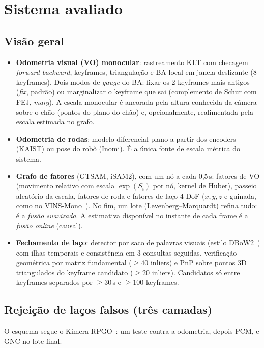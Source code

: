 \documentclass[11pt,a4paper]{article}
\begin{document}
\section{Sistema avaliado}
\label{sec:sistema}

\subsection{Visão geral}
\begin{itemize}
  \item \textbf{Odometria visual (VO) monocular}: rastreamento KLT com checagem \emph{forward-backward}, keyframes,
        triangulação e BA local em janela deslizante (8 keyframes). Dois modos de \emph{gauge} do BA: fixar os 2
        keyframes mais antigos (\emph{fix}, padrão) ou marginalizar o keyframe que sai (complemento de Schur com FEJ,
        \emph{marg}). A escala monocular é ancorada pela altura conhecida da câmera sobre o chão (pontos do plano do
        chão) e, opcionalmente, realimentada pela escala estimada no grafo.
  \item \textbf{Odometria de rodas}: modelo diferencial plano a partir dos encoders (KAIST) ou pose do robô (Inomi).
        É a única fonte de escala métrica do sistema.
  \item \textbf{Grafo de fatores} (GTSAM, iSAM2), com um nó a cada 0,5\,s:
        fatores de VO (movimento relativo com escala $\exp(S_i)$ por nó, kernel de Huber), passeio aleatório da escala,
        fatores de roda e fatores de laço 4-DoF ($x, y, z$ e guinada, como no VINS-Mono~\cite{qin2018vins}).
        No fim, um lote (Levenberg--Marquardt) refina tudo: é a \emph{fusão suavizada}. A estimativa disponível no
        instante de cada frame é a \emph{fusão online} (causal).
  \item \textbf{Fechamento de laço}: detector por saco de palavras visuais (estilo DBoW2~\cite{galvez2012dbow}) com
        ilhas temporais e consistência em 3 consultas seguidas, verificação geométrica por matriz fundamental
        ($\geq 40$ inliers) e PnP sobre pontos 3D triangulados do keyframe candidato ($\geq 20$ inliers). Candidatos
        só entre keyframes separados por $\geq 30$\,s e $\geq 100$ keyframes.
\end{itemize}

\subsection{Rejeição de laços falsos (três camadas)}
\label{sec:rejeicao}
O esquema segue o Kimera-RPGO~\cite{rosinol2020kimera}: um teste contra a odometria, depois PCM, e GNC no lote final.
\end{document}
